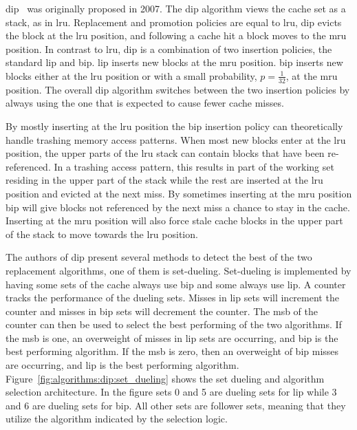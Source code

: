 \gls{dip}~\cite{Qureshi2007} was originally proposed in 2007.
The \gls{dip} algorithm views the cache set as a stack, as in \gls{lru}.
Replacement and promotion policies are equal to \gls{lru}, \gls{dip} evicts the block at the \gls{lru} position, and following a cache hit a block moves to the \gls{mru} position.
In contrast to \gls{lru}, \gls{dip} is a combination of two insertion policies, the standard \gls{lip} and \gls{bip}.
\gls{lip} inserts new blocks at the \gls{mru} position.
\gls{bip} inserts new blocks either at the \gls{lru} position or with a small probability, $p = \frac{1}{32}$, at the \gls{mru} position. 
The overall \gls{dip} algorithm switches between the two insertion policies by always using the one that is expected to cause fewer cache misses.

By mostly inserting at the \gls{lru} position the \gls{bip} insertion policy can theoretically handle trashing memory access patterns.
When most new blocks enter at the \gls{lru} position, the upper parts of the \gls{lru} stack can contain blocks that have been re-referenced.
In a trashing access pattern, this results in part of the working set residing in the upper part of the stack while the rest are inserted at the \gls{lru} position and evicted at the next miss.
By sometimes inserting at the \gls{mru} position \gls{bip} will give blocks not referenced by the next miss a chance to stay in the cache. 
Inserting at the \gls{mru} position will also force stale cache blocks in the upper part of the stack to move towards the \gls{lru} position.

The authors of \gls{dip} present several methods to detect the best of the two replacement algorithms, one of them is set-dueling.
Set-dueling is implemented by having some sets of the cache always use \gls{bip} and some always use \gls{lip}.
A counter tracks the performance of the dueling sets.
Misses in \gls{lip} sets will increment the counter and misses in \gls{bip} sets will decrement the counter.
The \gls{msb} of the counter can then be used to select the best performing of the two algorithms.
If the \gls{msb} is one, an overweight of misses in \gls{lip} sets are occurring, and \gls{bip} is the best performing algorithm. 
If the \gls{msb} is zero, then an overweight of \gls{bip} misses are occurring, and \gls{lip} is the best performing algorithm.
Figure~\ref{fig:algorithms:dip:set_dueling} shows the set dueling and algorithm selection architecture.
In the figure sets 0 and 5 are dueling sets for \gls{lip} while 3 and 6 are dueling sets for \gls{bip}.
All other sets are follower sets, meaning that they utilize the algorithm indicated by the selection logic.

